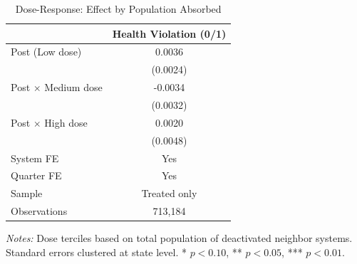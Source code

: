 \begin{table}[t]
\centering
\caption{Dose-Response: Effect by Population Absorbed}
\label{tab:dose}
\begin{threeparttable}
\begin{tabular}{lc}
\hline\hline
 & Health Violation (0/1) \\
\hline
Post (Low dose) & 0.0036 \\
 & (0.0024) \\
Post $\times$ Medium dose & -0.0034 \\
 & (0.0032) \\
Post $\times$ High dose & 0.0020 \\
 & (0.0048) \\
[0.5em]
System FE & Yes \\
Quarter FE & Yes \\
Sample & Treated only \\
Observations & 713,184 \\
\hline\hline
\end{tabular}
\begin{tablenotes}[flushleft]\small
\item \textit{Notes:} Dose terciles based on total population of deactivated neighbor systems. Standard errors clustered at state level. * $p<0.10$, ** $p<0.05$, *** $p<0.01$.
\end{tablenotes}
\end{threeparttable}
\end{table}

